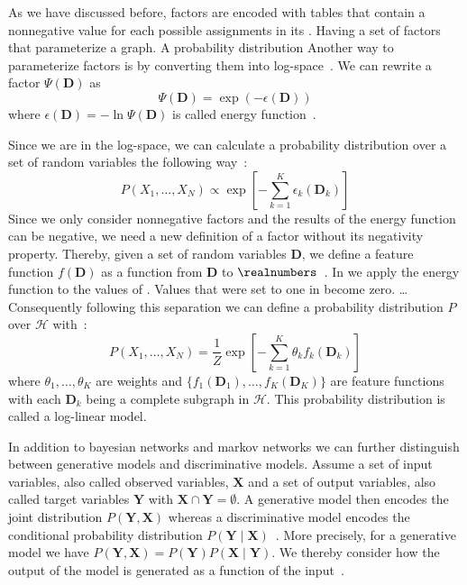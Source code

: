 As we have discussed before, \glspl{factor} are encoded with tables that contain a nonnegative value for each possible assignments in its .
Having a set of \glspl{factor} that parameterize a graph. A probability distribution
Another way to parameterize \glspl{factor} is by converting them into log-space~\citep{koller2009probabilistic}.
We can rewrite a factor $\Psi(\bm{D})$ as
\begin{equation*}
  \label{equ:energy-function}
  \Psi(\bm{D}) = \exp(-\epsilon(\bm{D}))
\end{equation*}
where $\epsilon(\bm{D})=-\ln\Psi(\bm{D})$ is called \gls{energy function}~\citep{koller2009probabilistic}.

Since we are in the log-space, we can calculate a \gls{probability distribution} over a set of \glspl{random variable} the following way~\citep{koller2009probabilistic}:
\begin{equation*}
  \label{equ:p-energy-function}
  P(X_1,\dots,X_N) \propto \exp\left [-\sum_{k=1}^K\epsilon_k(\bm{D}_k)\right ]
\end{equation*}
Since we only consider nonnegative \glspl{factor} and the results of the \gls{energy function} can be negative, we need a new definition of a \gls{factor} without its negativity property.
Thereby, given a set of \glspl{random variable} $\bm{D}$, we define a \gls{feature function} $f(\bm{D})$ as a function from $\bm{D}$ to $\realnumbers$~\citep{koller2009probabilistic}.
In  we apply the \gls{energy function} to the values of .
Values that were set to one in  become zero. \dots{}
Consequently following this separation we can define a \gls{probability distribution} $P$ over $\mathcal{H}$ with~\citep{koller2009probabilistic}:
\begin{equation}
  \label{equ:log-linear-model}
  P(X_1,\dots,X_N) = \frac{1}{Z}\exp\left [-\sum_{k=1}^K \theta_k f_k(\bm{D}_k)\right ]
\end{equation}
where $\theta_1,\dots,\theta_K$ are weights and $\{f_1(\bm{D}_1),\dots,f_K(\bm{D}_K)\}$ are \glspl{feature function} with each $\bm{D}_k$ being a complete subgraph in $\mathcal{H}$.
This \gls{probability distribution} is called a \gls{log-linear model}.

\bigskip

In addition to \glspl{bayesian network} and \glspl{markov network} we can further distinguish between \glspl{generative model} and \glspl{discriminative model}.
Assume a set of input variables, also called \glspl{observed variable}, $\bm{X}$ and a set of output variables, also called \glspl{target variable} $\bm{Y}$ with $\bm{X}\cap\bm{Y}=\emptyset$.
A \gls{generative model} then encodes the \gls{joint distribution} $P(\bm{Y},\bm{X})$ whereas a \gls{discriminative model} encodes the \gls{conditional probability distribution} $P(\bm{Y}\mid\bm{X})$~\citep{koller2009probabilistic}.
More precisely, for a \gls{generative model} we have $P(\bm{Y},\bm{X})=P(\bm{Y})P(\bm{X}\mid\bm{Y})$.
We thereby consider how the output of the model is generated as a function of the input~\citep{sutton2010introduction}.

